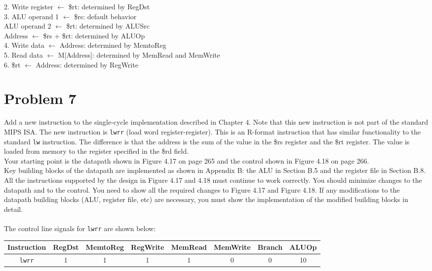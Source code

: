 \documentclass[10pt,letterpaper]{article}
\begin{document}
2. Write register $\leftarrow$ \$rt: determined by RegDst \\
3. ALU operand 1 $\leftarrow$ \$rs: default behavior \\
ALU operand 2 $\leftarrow$ \$rt: determined by ALUSrc \\
Address $\leftarrow$ \$rs + \$rt: determined by ALUOp \\
4. Write data $\leftarrow$ Address: determined by MemtoReg \\
5. Read data $\leftarrow$ M[Address]: determined by MemRead and MemWrite\\
6. \$rt $\leftarrow$ Address: determined by RegWrite \\

\pagebreak


\section{Problem 7}
Add a new instruction to the single-cycle implementation described in Chapter 4. Note that this new instruction is not part of the standard MIPS ISA. The new instruction is \texttt{lwrr} (load word register-register). This is an R-format instruction that has similar functionality to the standard \texttt{lw} instruction. The difference is that the address is the sum of the value in the \$rs register and the \$rt register. The value is loaded from memory to the register specified in the \$rd field.\\
Your starting point is the datapath shown in Figure 4.17 on page 265 and the control shown in Figure 4.18 on page 266.\\
Key building blocks of the datapath are implemented as shown in Appendix B: the ALU in Section B.5 and the register file in Section B.8.\\
All the instructions supported by the design in Figure 4.17 and 4.18 must continue to work correctly. You should minimize changes to the datapath and to the control. You need to show all the required changes to Figure 4.17 and Figure 4.18. If any modifications to the datapath building blocks (ALU, register file, etc) are necessary, you must show the implementation of the modified building blocks in detail.\\\\
The control line signals for \texttt{lwrr} are shown below:
\begin{center}
\begin{tabular} { |c|c|c|c|c|c|c|c|}
\hline
\textbf{Instruction} & \textbf{RegDst} & \textbf{MemtoReg} & \textbf{RegWrite} & \textbf{MemRead} & \textbf{MemWrite} & \textbf{Branch} & \textbf{ALUOp} \\
\hline
\texttt{lwrr} & 1 & 1 & 1 & 1 & 0 & 0 & 10 \\
\hline
\end{tabular}
\end{center}
\end{document}
